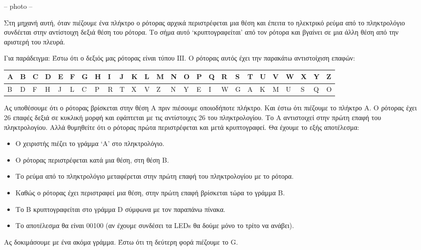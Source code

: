 \documentclass[a4paper,twoside,12pt]{article}
\begin{document}
-- photo --

Στη μηχανή αυτή, όταν πιέζουμε ένα πλήκτρο ο ρότορας αρχικά περιστρέφεται μια θέση και έπειτα το ηλεκτρικό ρεύμα από το πληκτρολόγιο συνδέεται στην αντίστοιχη δεξιά θέση του ρότορα.  Το σήμα αυτό `κρυπτογραφείται' από τον ρότορα και βγαίνει σε μια άλλη θέση από την αριστερή του πλευρά.

Για παράδειγμα: Έστω ότι ο δεξιός μας ρότορας είναι τύπου ΙΙΙ. Ο ρότορας αυτός έχει την παρακάτω αντιστοίχιση επαφών:

\begin{center}
\begin{tabularx}{\textwidth}{|*{26}{>{\centering\arraybackslash}X|}}
\hline
A&B&C&D&E&F&G&H&I&J&K&L&M&N&O&P&Q&R&S&T&U&V&W&X&Y&Z\\
\hline
B&D&F&H&J&L&C&P&R&T&X&V&Z&N&Y&E&I&W&G&A&K&M&U&S&Q&O\\
\hline
\end{tabularx}
\end{center}

Ας υποθέσουμε ότι ο ρότορας βρίσκεται στην θέση Α πριν πιέσουμε οποιοδήποτε πλήκτρο. Και έστω ότι πιέζουμε το πλήκτρο Α. Ο ρότορας έχει 26 επαφές δεξιά σε κυκλική μορφή και εφάπτεται με τις αντίστοιχες 26 του πληκτρολογίου. Το Α αντιστοιχεί στην πρώτη επαφή του πληκτρολογίου. Αλλά θυμηθείτε ότι ο ρότορας πρώτα περιστρέφεται και μετά κρυπτογραφεί. Θα έχουμε το εξής αποτέλεσμα:

\begin{itemize}
\item Ο χειριστής πιέζει το γράμμα `Α' στο πληκτρολόγιο.
\item O ρότορας περιστρέφεται κατά μια θέση, στη θέση Β.
\item Το ρεύμα από το πληκτρολόγιο μεταφέρεται στην πρώτη επαφή του πληκτρολογίου με το ρότορα.
\item Καθώς ο ρότορας έχει περιστραφεί μια θέση, στην πρώτη επαφή βρίσκεται τώρα το γράμμα Β.
\item Το B κρυπτογραφείται στο γράμμα D σύμφωνα με τον παραπάνω πίνακα.
\item Το αποτέλεσμα θα είναι 00100  (αν έχουμε συνδέσει τα LEDs θα δούμε μόνο το τρίτο να ανάβει).
\end{itemize}

Ας δοκιμάσουμε με ένα ακόμα γράμμα. Έστω ότι τη δεύτερη φορά πιέζουμε το G.
\end{document}
